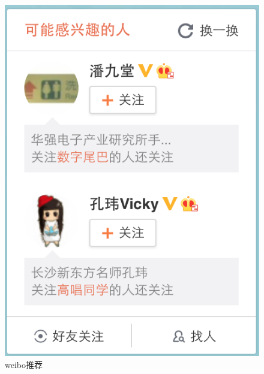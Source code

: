 \begin{figure}[h]
\begin{minipage}[t]{0.45\linewidth}
\includegraphics[width=\textwidth]{img/chap1/weibo_recommend.png}
\caption{weibo推荐\label{weibo推荐}}
\end{minipage}

\end{figure}

